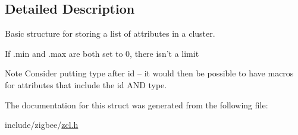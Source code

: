 \subsection{Detailed Description}
Basic structure for storing a list of attributes in a cluster. 

If .min and .max are both set to 0, there isn't a limit

\begin{DoxyNote}{Note}
Consider putting type after id -- it would then be possible to have macros for attributes that include the id A\-N\-D type. 
\end{DoxyNote}


The documentation for this struct was generated from the following file\-:\begin{DoxyCompactItemize}
\item 
include/zigbee/\hyperlink{zcl_8h}{zcl.\-h}\end{DoxyCompactItemize}
